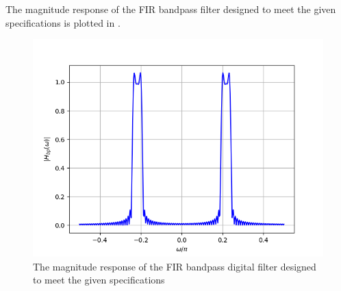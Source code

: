 \documentclass[article]{IEEEtran}
\theoremstyle{remark}
\numberwithin{equation}{subsection}
\begin{document}
The magnitude response of the FIR bandpass filter designed to meet the given specifications is plotted in .
\begin{figure}[!ht]
\includegraphics[width = \columnwidth]{figs/fig6.png}
\caption{The magnitude response of the FIR bandpass digital filter designed to meet the given specifications} 
\label{fig6}
\end{figure}
\end{document}

